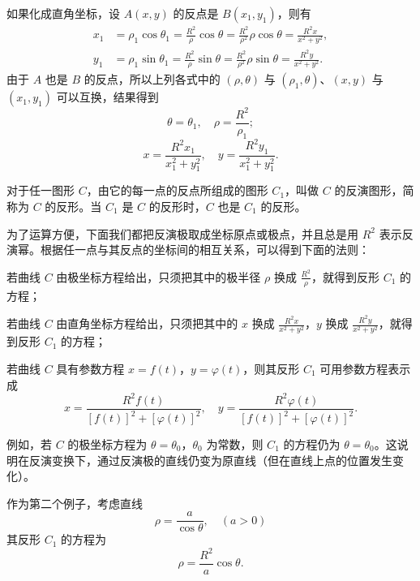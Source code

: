 \medskip
\noindent
如果化成直角坐标，设 $A(x,y)$ 的反点是 $B(x_1, y_1)$，则有
\begin{align*}
  x_1 &= \rho_1\cos\theta_1 = \frac{R^2}{\rho}\cos\theta = \frac{R^2}{\rho^2}\rho\cos\theta = \frac{R^2 x}{x^2+y^2}, \\
  y_1 &= \rho_1\sin\theta_1 = \frac{R^2}{\rho}\sin\theta = \frac{R^2}{\rho^2}\rho\sin\theta = \frac{R^2 y}{x^2+y^2}.
\end{align*}
由于 $A$ 也是 $B$ 的反点，所以上列各式中的 $(\rho, \theta)$ 与 $(\rho_1, \theta)$、$(x,y)$ 与 $(x_1, y_1)$ 可以互换，结果得到
\[
  \theta = \theta_1,\quad \rho = \frac{R^2}{\rho_1};
\]
\[
  x = \frac{R^2 x_1}{x_1^2+y_1^2},\quad y = \frac{R^2 y_1}{x_1^2+y_1^2}.
\]

对于任一图形 $C$，由它的每一点的反点所组成的图形 $C_1$，叫做 $C$ 的反演图形，简称为 $C$ 的反形。当 $C_1$ 是 $C$ 的反形时，$C$ 也是 $C_1$ 的反形。

为了运算方便，下面我们都把反演极取成坐标原点或极点，并且总是用 $R^2$ 表示反演幂。根据任一点与其反点的坐标间的相互关系，可以得到下面的法则：

若曲线 $C$ 由极坐标方程给出，只须把其中的极半径 $\rho$ 换成 $\frac{R^2}{\rho}$，就得到反形 $C_1$ 的方程；

若曲线 $C$ 由直角坐标方程给出，只须把其中的 $x$ 换成 $\frac{R^2 x}{x^2+y^2}$，$y$ 换成 $\frac{R^2 y}{x^2+y^2}$，就得到反形 $C_1$ 的方程；

若曲线 $C$ 具有参数方程 $x=f(t)$，$y=\varphi(t)$，则其反形 $C_1$ 可用参数方程表示成
\[
  x = \frac{R^2 f(t)}{[f(t)]^2 + [\varphi(t)]^2},\quad y = \frac{R^2 \varphi(t)}{[f(t)]^2 + [\varphi(t)]^2}.
\]

例如，若 $C$ 的极坐标方程为 $\theta=\theta_0$，$\theta_0$ 为常数，则 $C_1$ 的方程仍为 $\theta=\theta_0$。这说明在反演变换下，通过反演极的直线仍变为原直线（但在直线上点的位置发生变化）。

作为第二个例子，考虑直线
\[
  \rho = \frac{a}{\cos\theta},\quad (a>0)
\]
其反形 $C_1$ 的方程为
\[
  \rho = \frac{R^2}{a}\cos\theta.
\]

